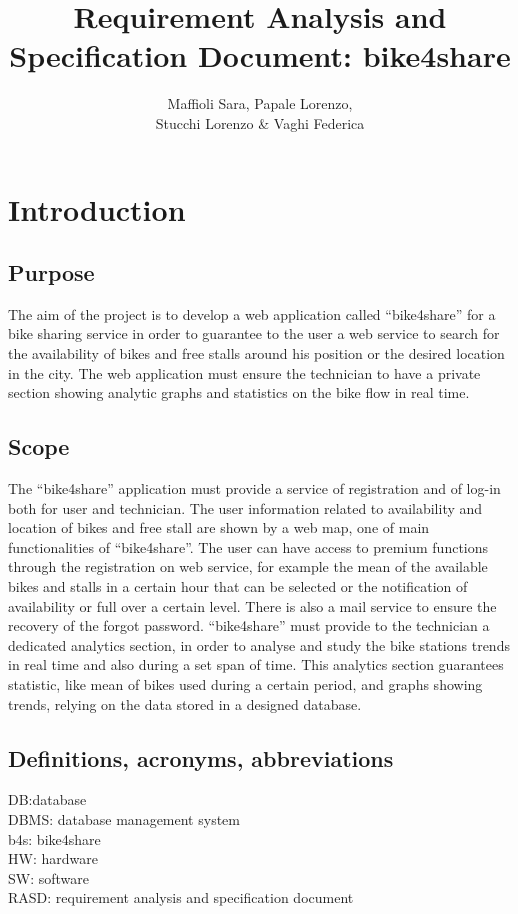 \documentclass{article}
\title{Requirement Analysis and Specification Document: bike4share}
\author{Maffioli Sara, Papale Lorenzo, \\ Stucchi Lorenzo \& Vaghi Federica}
\begin{document}
\maketitle
\tableofcontents

\newpage

\section{Introduction}
\subsection{Purpose}
The aim of the project is to develop a web application called “bike4share” for a bike sharing service in order to guarantee to the user a web service to search for the availability of bikes and free stalls around his position or the desired location in the city. The web application must ensure the technician to have a private section showing analytic graphs and statistics on the bike flow in real time.
\subsection{Scope}
The “bike4share” application must provide a service of registration and of log-in both for user and technician. The user information related to availability and location of bikes and free stall are shown by a web map, one of main functionalities of “bike4share”. The user can have access to premium functions through the registration on web service, for example the mean of the available bikes and stalls in a certain hour that can be selected or the notification of availability or full over a certain level. There is also a mail service to ensure the recovery of the forgot password.
“bike4share” must provide to the technician a dedicated analytics section, in order to analyse and study the bike stations trends in real time and also during a set span of time. This analytics section guarantees statistic, like mean of bikes used during a certain period, and graphs showing trends, relying on the data stored in a designed database.
\subsection{Definitions, acronyms, abbreviations}
DB:database\\
DBMS: database management system\\
b4s: bike4share\\
HW: hardware\\
SW: software\\
RASD: requirement analysis and specification document
\end{document}
